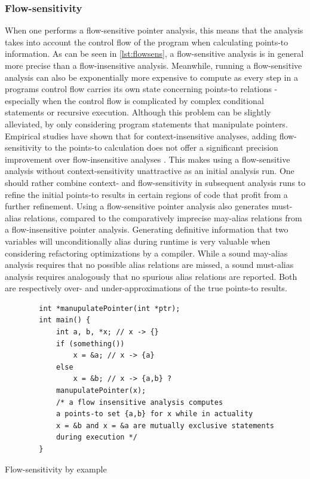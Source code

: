 \subsubsection{Flow-sensitivity}
When one performs a flow-sensitive pointer analysis, this means that the analysis takes into account the control flow of the program when calculating points-to information.
As can be seen in \autoref{lst:flowsens}, a flow-sensitive analysis is in general more precise than a flow-insensitive analysis. Meanwhile, running a flow-sensitive analysis can also be exponentially more expensive to compute as every step in a programs control flow carries its own state concerning points-to relations - especially when the control flow is complicated by complex conditional statements or recursive execution.
Although this problem can be slightly alleviated, by only considering program statements that manipulate pointers.
Empirical studies have shown that for context-insensitive analyses, adding flow-sensitivity to the points-to calculation does not offer a significant precision improvement over flow-insensitive analyses \cite{hind2001pointer}. This makes using a flow-sensitive analysis without context-sensitivity unattractive as an initial analysis run. One should rather combine context- and flow-sensitivity in subsequent analysis runs to refine the initial points-to results in certain regions of code that profit from a further refinement.
Using a flow-sensitive pointer analysis also generates must-alias relations, compared to the comparatively imprecise may-alias relations from a flow-insensitive pointer analysis.
Generating definitive information that two variables will unconditionally alias during runtime is very valuable when considering refactoring optimizations by a compiler.
While a sound may-alias analysis requires that no possible alias relations are missed, a sound must-alias analysis requires analogously that no spurious alias relations are reported. Both are respectively over- and under-approximations of the true points-to results.

\begin{listing}
    \begin{verbatim}
        int *manupulatePointer(int *ptr);
        int main() {
            int a, b, *x; // x -> {}
            if (something())
                x = &a; // x -> {a}
            else
                x = &b; // x -> {a,b} ?
            manupulatePointer(x);
            /* a flow insensitive analysis computes 
            a points-to set {a,b} for x while in actuality 
            x = &b and x = &a are mutually exclusive statements
            during execution */
        }
    \end{verbatim}
    \caption{Flow-sensitivity by example}
    \label{lst:flowsens}
\end{listing}

